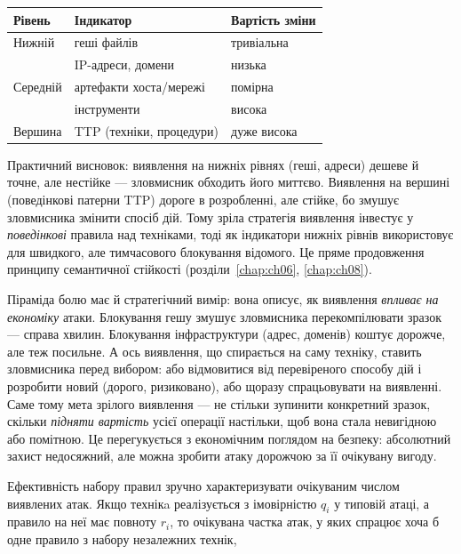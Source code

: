 
\begin{center}\footnotesize
\begin{tabularx}{\linewidth}{L{22mm} Y L{18mm}}
\toprule
Рівень & Індикатор & Вартість зміни \\
\midrule
Нижній & геші файлів & тривіальна \\
 & IP-адреси, домени & низька \\
Середній & артефакти хоста/мережі & помірна \\
 & інструменти & висока \\
Вершина & TTP (техніки, процедури) & дуже висока \\
\bottomrule
\end{tabularx}
\end{center}

Практичний висновок: виявлення на нижніх рівнях (геші, адреси) дешеве й точне, але нестійке --- зловмисник обходить його миттєво. Виявлення на вершині (поведінкові патерни TTP) дороге в розробленні, але стійке, бо змушує зловмисника змінити спосіб дій. Тому зріла стратегія виявлення інвестує у \emph{поведінкові} правила над техніками, тоді як індикатори нижніх рівнів використовує для швидкого, але тимчасового блокування відомого. Це пряме продовження принципу семантичної стійкості (розділи~\ref{chap:ch06}, \ref{chap:ch08}).

Піраміда болю має й стратегічний вимір: вона описує, як виявлення \emph{впливає на економіку} атаки. Блокування гешу змушує зловмисника перекомпілювати зразок --- справа хвилин. Блокування інфраструктури (адрес, доменів) коштує дорожче, але теж посильне. А ось виявлення, що спирається на саму техніку, ставить зловмисника перед вибором: або відмовитися від перевіреного способу дій і розробити новий (дорого, ризиковано), або щоразу спрацьовувати на виявленні. Саме тому мета зрілого виявлення --- не стільки зупинити конкретний зразок, скільки \emph{підняти вартість} усієї операції настільки, щоб вона стала невигідною або помітною. Це перегукується з економічним поглядом на безпеку: абсолютний захист недосяжний, але можна зробити атаку дорожчою за її очікувану вигоду.

Ефективність набору правил зручно характеризувати очікуваним числом виявлених атак. Якщо технікa реалізується з імовірністю $q_i$ у типовій атаці, а правило на неї має повноту $r_i$, то очікувана частка атак, у яких спрацює хоча б одне правило з набору незалежних технік,


